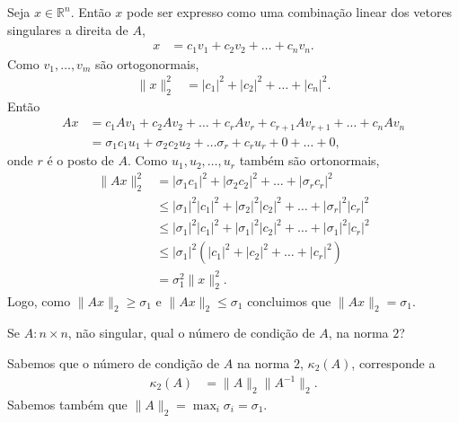 \begin{questions}
\begin{solution}
        Seja $x \in \mathbb{R}^n$. Ent\~{a}o $x$ pode ser expresso como uma combina\c{c}\~{a}o linear dos vetores singulares a direita de $A$,
        \begin{align*}
            x &= c_1 v_1 + c_2 v_2 + \ldots + c_n v_n.
        \end{align*}
        Como $v_1, \ldots, v_m$ s\~{a}o ortogonormais,
        \begin{align*}
            \| x \|_2^2 &= | c_1 |^2 + | c_2 |^2 + \ldots + | c_n |^2.
        \end{align*}
        Ent\~{a}o
        \begin{align*}
            A x &= c_1 A v_1 + c_2 A v_2 + \ldots + c_r A v_r + c_{r + 1} A v_{r + 1} + \ldots + c_n A v_n \\
            &= \sigma_1 c_1 u_1 + \sigma_2 c_2 u_2 + \ldots \sigma_r + c_r u_r + 0 + \ldots + 0,
        \end{align*}
        onde $r$ \'{e} o posto de $A$. Como $u_1, u_2, \ldots, u_r$ tamb\'{e}m s\~{a}o ortonormais,
        \begin{align*}
            \| A x \|_2^2 &= | \sigma_1 c_1 |^2 + | \sigma_2 c_2 |^2 + \ldots + | \sigma_r c_r |^2 \\
            &\leq | \sigma_1 |^2 | c_1 |^2 + | \sigma_2 |^2 | c_2 |^2 + \ldots + | \sigma_r |^2 | c_r |^2 \\
            &\leq | \sigma_1 |^2 | c_1 |^2 + | \sigma_1 |^2 | c_2 |^2 + \ldots + | \sigma_1 |^2 | c_r |^2 \\
            &\leq | \sigma_1 |^2 \left( | c_1 |^2 + | c_2 |^2 + \ldots + | c_r |^2 \right) \\
            &= \sigma_1^2 \| x \|_2^2.
        \end{align*}
        Logo, como $\| A x \|_2 \geq \sigma_1$ e $\| A x \|_2 \leq \sigma_1$ concluimos que $\| A x \|_2 = \sigma_1$.
    \end{solution}

     Se $A : n \times n$, n\~{a}o singular, qual o n\'{u}mero de condi\c{c}\~{a}o de $A$, na norma $2$?
    \begin{solution}
        Sabemos que o n\'{u}mero de condi\c{c}\~{a}o de $A$ na norma $2$, $\kappa_2(A)$, corresponde a
        \begin{align*}
            \kappa_2(A) &= \| A \|_2 \| A^{-1} \|_2.
        \end{align*}
        Sabemos tamb\'{e}m que $\| A \|_2 = \max_i \sigma_i = \sigma_1$.


\end{solution}
\end{questions}
